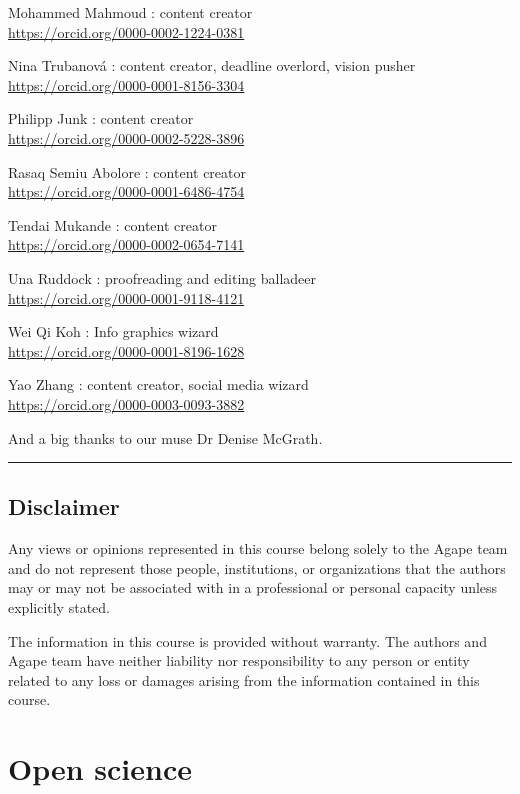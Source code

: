 \documentclass[
]{book}
\begin{document}
Mohammed Mahmoud : content creator\\
\url{https://orcid.org/0000-0002-1224-0381}

Nina Trubanová : content creator, deadline overlord, vision pusher\\
\url{https://orcid.org/0000-0001-8156-3304}

Philipp Junk : content creator\\
\url{https://orcid.org/0000-0002-5228-3896}

Rasaq Semiu Abolore : content creator\\
\url{https://orcid.org/0000-0001-6486-4754}

Tendai Mukande : content creator\\
\url{https://orcid.org/0000-0002-0654-7141}

Una Ruddock : proofreading and editing balladeer\\
\url{https://orcid.org/0000-0001-9118-4121}

Wei Qi Koh : Info graphics wizard\\
\url{https://orcid.org/0000-0001-8196-1628}

Yao Zhang : content creator, social media wizard\\
\url{https://orcid.org/0000-0003-0093-3882}

And a big thanks to our muse Dr Denise McGrath.

\begin{center}\rule{0.5\linewidth}{0.5pt}\end{center}

\hypertarget{disclaimer}{%
\section*{Disclaimer}\label{disclaimer}}

Any views or opinions represented in this course belong solely to the Agape team and do not represent those people, institutions, or organizations that the authors may or may not be associated with in a professional or personal capacity unless explicitly stated.

The information in this course is provided without warranty. The authors and Agape team have neither liability nor responsibility to any person or entity related to any loss or damages arising from the information contained in this course.

\hypertarget{open-science}{%
\chapter{Open science}\label{open-science}}
\end{document}
